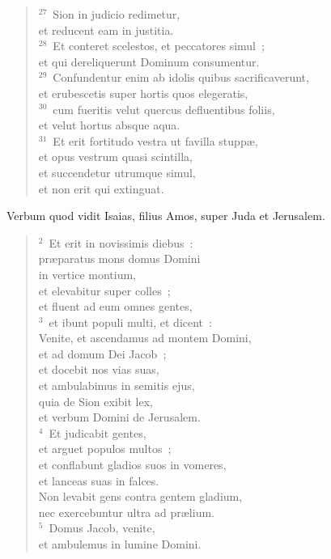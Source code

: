 \begin{flushleft}
\begin{verse}
${}^{27}$~Sion in judicio redimetur,\\ et reducent eam in justitia.\\
${}^{28}$~Et conteret scelestos, et peccatores simul~;\\ et qui dereliquerunt Dominum consumentur.\\
${}^{29}$~Confundentur enim ab idolis quibus sacrificaverunt,\\ et erubescetis super hortis quos elegeratis,\\
${}^{30}$~cum fueritis velut quercus defluentibus foliis,\\ et velut hortus absque aqua.\\
${}^{31}$~Et erit fortitudo vestra ut favilla stupp\ae ,\\ et opus vestrum quasi scintilla,\\ et succendetur utrumque simul,\\ et non erit qui extinguat.\end{verse}\end{flushleft}



\lettrine[lines=3,image=true,loversize=0.05,lraise=-0.03]{V}{}erbum quod vidit Isaias, filius Amos, super Juda et Jerusalem.
\begin{flushleft}\begin{verse}\vspace{6pt}${}^{2}$~Et erit in novissimis diebus~:\\ pr\ae paratus mons domus Domini\\ in vertice montium,\\ et elevabitur super colles~;\\ et fluent ad eum omnes gentes,\\
${}^{3}$~et ibunt populi multi, et dicent~:\\ Venite, et ascendamus ad montem Domini,\\ et ad domum Dei Jacob~;\\ et docebit nos vias suas,\\ et ambulabimus in semitis ejus,\\ quia de Sion exibit lex,\\ et verbum Domini de Jerusalem.\\
${}^{4}$~Et judicabit gentes,\\ et arguet populos multos~;\\ et conflabunt gladios suos in vomeres,\\ et lanceas suas in falces.\\ Non levabit gens contra gentem gladium,\\ nec exercebuntur ultra ad pr\ae lium.\\
${}^{5}$~Domus Jacob, venite,\\ et ambulemus in lumine Domini.\end{verse}\end{flushleft}


